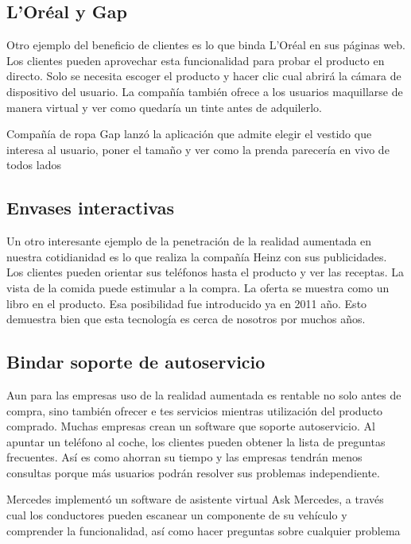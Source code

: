 \documentclass[a4paper,11pt]{scrartcl}
\begin{document}
\subsection{L'Oréal y Gap}
Otro ejemplo del beneficio de clientes es lo que binda L'Oréal en sus páginas web\cite{loreal}. Los clientes pueden aprovechar esta funcionalidad para probar el producto en directo. Solo se necesita escoger el producto y hacer clic cual abrirá la cámara de dispositivo del usuario. La compañía también ofrece a los usuarios maquillarse de manera virtual y ver como quedaría un tinte antes de adquilerlo.\\
\par Compañía de ropa Gap lanzó la aplicación\cite{gap} que admite elegir el vestido que interesa al usuario, poner el tamaño y ver como la prenda parecería en vivo de todos lados

\subsection{Envases interactivas}
Un otro interesante ejemplo de la penetración de la realidad aumentada en nuestra cotidianidad es lo que realiza la compañía Heinz\cite{heinz} con sus publicidades. Los clientes pueden orientar sus teléfonos hasta el producto y ver las receptas. La vista de la comida puede estimular a la compra. La oferta se muestra como un libro en el producto. Esa posibilidad fue introducido ya en 2011 año. Esto demuestra bien que esta tecnología es cerca de nosotros por muchos años.


\subsection{Bindar soporte de autoservicio}
Aun para las empresas uso de la realidad aumentada es rentable no solo antes de compra, sino también ofrecer e tes servicios mientras utilización del producto comprado. Muchas empresas crean un software que soporte autoservicio. Al apuntar un teléfono al coche, los clientes pueden obtener la lista de preguntas frecuentes. Así es como ahorran su tiempo y las empresas tendrán menos consultas porque más usuarios podrán resolver sus problemas independiente. \\
\par Mercedes implementó un software\cite{mercedes} de asistente virtual Ask Mercedes, a través cual los conductores pueden escanear un componente de su vehículo y comprender la funcionalidad, así como hacer preguntas sobre cualquier problema \\
\end{document}
